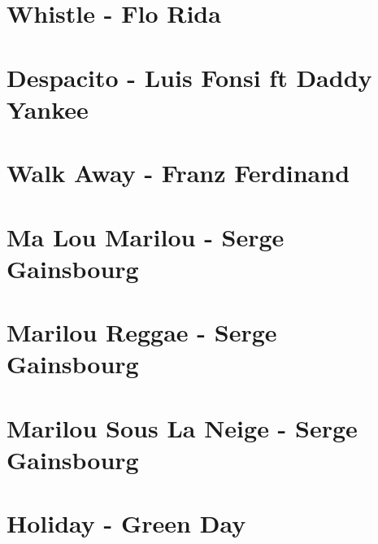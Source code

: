 \documentclass{guitartabs}
\begin{document}
\section{Whistle - Flo Rida}
\begin{guitar}

\end{guitar}

\section{Despacito - Luis Fonsi ft Daddy Yankee}
\begin{guitar}

\end{guitar}



\section{Walk Away - Franz Ferdinand}
\begin{guitar}

\end{guitar}


\section{Ma Lou Marilou - Serge Gainsbourg}
\begin{guitar}

\end{guitar}

\section{Marilou Reggae - Serge Gainsbourg}
\begin{guitar}

\end{guitar}

\section{Marilou Sous La Neige - Serge Gainsbourg}
\begin{guitar}

\end{guitar}

\section*{Holiday - Green Day}
\begin{guitar}

\end{guitar}
\end{document}
